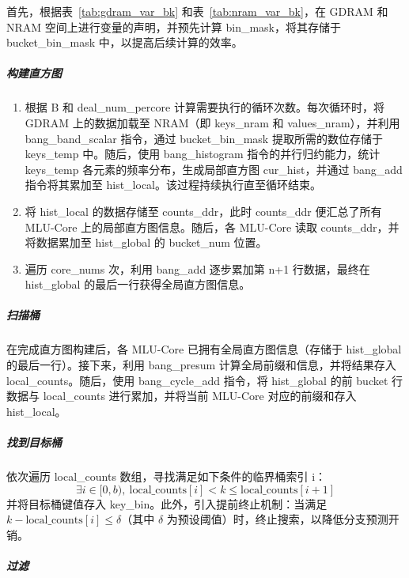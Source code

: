 首先，根据表~\ref{tab:gdram_var_bk} 和表~\ref{tab:nram_var_bk}，在 GDRAM 和 NRAM 空间上进行变量的声明，并预先计算 bin\_mask，将其存储于 bucket\_bin\_mask 中，以提高后续计算的效率。

\subparagraph{构建直方图}

\begin{enumerate}
    \item 根据 B 和 deal\_num\_percore 计算需要执行的循环次数。每次循环时，将 GDRAM 上的数据加载至 NRAM（即 keys\_nram 和 values\_nram），并利用 bang\_band\_scalar 指令，通过 bucket\_bin\_mask 提取所需的数位存储于 keys\_temp 中。随后，使用 bang\_histogram 指令的并行归约能力，统计 keys\_temp 各元素的频率分布，生成局部直方图 cur\_hist，并通过 bang\_add 指令将其累加至 hist\_local。该过程持续执行直至循环结束。
    
    \item 将 hist\_local 的数据存储至 counts\_ddr，此时 counts\_ddr 便汇总了所有 MLU-Core 上的局部直方图信息。随后，各 MLU-Core 读取 counts\_ddr，并将数据累加至 hist\_global 的 bucket\_num 位置。

    \item 遍历 core\_nums 次，利用 bang\_add 逐步累加第 n+1 行数据，最终在 hist\_global 的最后一行获得全局直方图信息。
\end{enumerate}

\subparagraph{扫描桶}

在完成直方图构建后，各 MLU-Core 已拥有全局直方图信息（存储于 hist\_global 的最后一行）。接下来，利用 bang\_presum 计算全局前缀和信息，并将结果存入 local\_counts。随后，使用 bang\_cycle\_add 指令，将 hist\_global 的前 bucket 行数据与 local\_counts 进行累加，并将当前 MLU-Core 对应的前缀和存入 hist\_local。

\subparagraph{找到目标桶}

依次遍历 local\_counts 数组，寻找满足如下条件的临界桶索引 i：
\begin{equation}
\exists i \in [0,b),\ \text{local\_counts}[i] < k \leqslant \text{local\_counts}[i+1]
\end{equation}
并将目标桶键值存入 key\_bin。此外，引入提前终止机制：当满足 $ k - \text{local\_counts}[i] \leqslant \delta $（其中 $\delta$ 为预设阈值）时，终止搜索，以降低分支预测开销。

\subparagraph{过滤}

